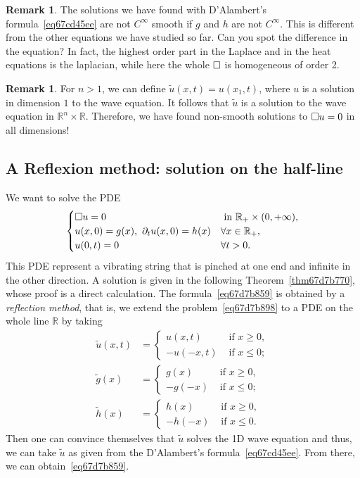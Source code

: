 \documentclass[a4paper,9pt]{amsart}
\newcommand{\R}{\mathbb{R}}	%
\newcommand{\de}{\partial}		%
\theoremstyle{plain}
\theoremstyle{definition}
\newtheorem{remark}[proposition]{Remark}
\theoremstyle{remark}
\begin{document}
\begin{remark}
	The solutions we have found with D'Alambert's formula~\eqref{eq67cd45ee} are not $C^\infty$ smooth if $g$ and $h$ are not $C^\infty$.
	This is different from the other equations we have studied so far.
	Can you spot the difference in the equation? 
	In fact, the highest order part in the Laplace and in the heat equations is the laplacian, while here the whole $\square$ is homogeneous of order 2.
\end{remark}

\begin{remark}
	For $n>1$, we can define $\tilde u(x,t) = u(x_1,t)$, where $u$ is a solution in dimension $1$ to the wave equation.
	It follows that $\tilde u$ is a solution to the wave equation in $\R^n\times\R$.
	Therefore, we have found non-smooth solutions to $\square u=0$ in all dimensions!
\end{remark}

\subsection{A Reflexion method: solution on the half-line}\label{subs67cd4e88}

We want to solve the PDE
\begin{equation}\label{eq67d7b898}
	\begin{cases}
		\waveop u =0 & \text{ in }\R_+\times(0,+\infty) , \\
		u(x,0)=g(x),\ \de_tu(x,0) = h(x) & \forall x\in\R_+ , \\
		u(0,t) = 0 & \forall t>0 .
	\end{cases}
\end{equation}
This PDE represent a vibrating string that is pinched at one end and infinite in the other direction.
A solution is given in the following Theorem~\ref{thm67d7b770},
whose proof is a direct calculation.
The formula~\eqref{eq67d7b859} is obtained by a \emph{reflection method},
that is, we extend the problem~\eqref{eq67d7b898} to a PDE on the whole line $\R$ by taking
\begin{align*}
	\tilde u(x,t) &= 
	\begin{cases}
		u(x,t) & \text{ if } x\ge 0 ,\\
		-u(-x,t) & \text{ if } x\le 0 ;
	\end{cases} \\
	\tilde g(x) &= 
	\begin{cases}
		g(x) & \text{ if } x\ge 0 ,\\
		-g(-x) & \text{ if } x\le 0 ;
	\end{cases} \\
	\tilde h(x) &= 
	\begin{cases}
		h(x) & \text{ if } x\ge 0 ,\\
		-h(-x) & \text{ if } x\le 0 .
	\end{cases} 
\end{align*}
Then one can convince themselves that $\tilde u$ solves the 1D wave equation and thus, we can take $\tilde u$ as given from the D'Alambert's formula~\eqref{eq67cd45ee}.
From there, we can obtain~\eqref{eq67d7b859}.
\end{document}
